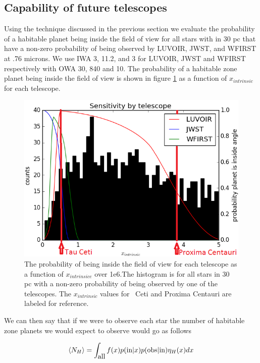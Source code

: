 \documentclass{article}
\begin{document}
	\subsection{Capability of future telescopes}
	
	Using the technique discussed in the previous section we evaluate the probability of a habitable planet being inside the field of view for all stars with in 30 pc that have a non-zero probability of being observed by LUVOIR, JWST, and WFIRST at .76 microns. We use IWA 3, 11.2, and 3 for LUVOIR, JWST and WFIRST respectively with OWA 30, 840 and 10. The probability of a habitable zone planet being inside the field of view is shown in figure \ref{fig:telescopes} as a function of $x_{intrinsic}$ for each telescope. 
	
	\begin{figure}
		\includegraphics[width = \linewidth]{all_planet_expect_labeled.png}
		\caption{The probability of being inside the field of view for each telescope as a function of $x_{intrinsice}$ over 1e6.The histogram is for all stars in 30 pc with a non-zero probability of being observed by one of the telescopes. The $x_{intrinsic}$ values for \texttau \ Ceti and Proxima Centauri are labeled for reference.}
		\label{fig:telescopes}
	\end{figure}
	
	We can then say that if we were to observe each star the number of habitable zone planets we would expect to observe would go as follows
	
	\begin{equation}
	\braket{N_H} = \int_{\mbox{all}} f(x) p(\mbox{in}|x) p(\mbox{obs}|\mbox{in}) \eta_H(x) dx
	\end{equation}
	
\end{document}
